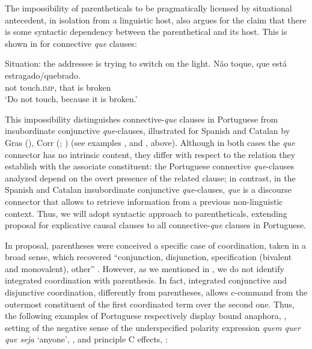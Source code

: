 \documentclass[output=paper,colorlinks,citecolor=brown,
]{langscibook}
\begin{document}
The impossibility of parentheticals to be pragmatically licensed by situational antecedent, in isolation from a linguistic host, also argues for the claim that there is some syntactic dependency between the parenthetical and its host. This is shown in  for connective \textit{que} clauses:

\ea \label{ex:matos:situation}
Situation: the addressee is trying to switch on the light.
  \label{ex:matos:estragado-a}
 \ex \label{ex:matos:estragado-b}
 \gll Não toque, que está estragado/quebrado.\\
	  not touch.\textsc{imp}, that is broken\\
 \glt ‘Do not touch, because it is broken.’ 
 \z
\z 

This impossibility distinguishes connective-\textit{que} clauses in Portuguese from insubordinate conjunctive \textit{que}-clauses, illustrated for Spanish and Catalan by Gras (\citeyear{gras_revisiting_2016}), Corr (\citeyear{corr_ibero-romance_2016}; \citeyear{corr_matrix_2018}) (see examples ,  and , above). Although in both cases the \textit{que} connector has no intrinsic content, they differ with respect to the relation they establish with the associate constituent: the Portuguese connective \textit{que}-clauses analyzed depend on the overt presence of the related clause; in contrast, in the Spanish and Catalan insubordinate conjunctive \textit{que}-clauses, \textit{que} is a discourse connector that allows to retrieve information from a previous non-linguistic context. Thus, we will adopt \citet{de_vries_unconventional_2012} syntactic approach to parentheticals, extending \citet{colaco_explicative_2016} proposal for explicative causal clauses to all connective-\textit{que} clauses in Portuguese. 

In \citet{de_vries_invisible_2007} proposal, parentheses were conceived a specific case of coordination, taken in a broad sense, which recovered “conjunction, disjunction, specification (bivalent and monovalent), other” \citep[231]{de_vries_invisible_2007}. However, as we mentioned in , we do not identify integrated coordination with parenthesis. In fact, integrated conjunctive and disjunctive coordination, differently from parentheses, allows c-command from the outermost constituent of the first coordinated term over the second one. Thus, the following examples of Portuguese respectively display bound anaphora, , setting of the negative sense of the underspecified polarity expression \textit{quem quer que seja} ‘anyone’, , and principle C effects, : 
\end{document}
